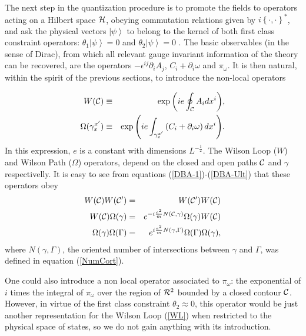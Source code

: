 \documentclass[a4paper,12pt]{article}
\newcommand{\ket}[1]{\left|#1\right\rangle}
\newcommand{\eref}[1]{(\ref{#1})}
\newcommand{\db}[2]{\left\{#1,#2\right\}^*}
\begin{document}
The next step in the quantization procedure is to promote the
fields to operators acting on a Hilbert space $\cal H$, obeying
commutation relations given by $i\db\cdot\cdot$, and ask the
physical vectors $\ket\psi$ to belong to the kernel of both first
class constraint operators: $\theta_1\ket\psi=0$ and
$\theta_2\ket\psi=0$ . The basic observables (in the sense of
Dirac), from which all relevant gauge invariant information of
the theory can be recovered, are the operators
$-\epsilon^{ij}\partial_i A_j$, $C_i+\partial_i \omega$ and
$\pi_\omega$. It is then natural, within the spirit of the
previous sections, to introduce the non-local operators

\begin{eqnarray}
W(\cal C)&\equiv&\exp{\left(ie\oint_{\cal C}A_idx^i\right)},\label{WL}\\
\Omega(\gamma_x^{x'})&\equiv&\exp{\left(ie\int_{\gamma_x^{x'}}
\left(C_i+\partial_i\omega\right)dx^i\right)}.\label{Wpath}
\end{eqnarray}
In this expression, $e$ is a constant with dimensions
$L^{-\frac12}$. The Wilson Loop  ($W$) and Wilson Path ($\Omega$)
operators, depend on the closed and open paths  $\cal C$ and
$\gamma$ respectivelly. It is easy to see from equations
\eref{DBA-1}-\eref{DBA-Ult} that these operators obey
\begin{eqnarray}
W({\cal C})W({\cal C'})&=&W({\cal C'})W({\cal C})\label{dual-al1}\\
W({\cal C})\Omega(\gamma)&=&e^{-i\frac{e^2}m N({\cal C},\gamma)}
\Omega(\gamma)W({\cal C})\label{dual-al2}\\
\Omega(\gamma)\Omega(\Gamma)&=&e^{i\frac{e^2}m N(\gamma,\Gamma)}
\Omega(\Gamma)\Omega(\gamma)\label{dual-al3},
\end{eqnarray}
where $N(\gamma,\Gamma)$, the oriented number of intersections
between $\gamma$ and $\Gamma$, was defined in equation
\eref{NumCort}.

One could also introduce a non local operator associated to $\pi_\omega$:
the exponential of $i$ times the integral of $\pi_\omega$ over the region 
of ${\cal R}^2$ bounded by a closed contour $\cal C$. However, in virtue of 
the first class constraint $\theta_2\approx 0$, this operator would be just another
representation for the Wilson Loop \eref{WL} when restricted to the physical
space of states, so we do not gain anything with its introduction.
\end{document}
